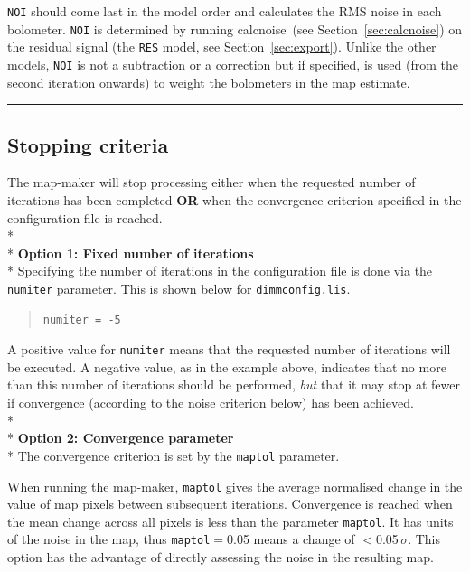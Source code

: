 \documentclass[twoside,11pt]{article}
\newcommand{\htmlref}[2]{#1}
\newenvironment{latexonly}{}{}
\newcommand{\latexhtml}[2]{#1}
\newcommand{\xref}[3]{#1}
\newcommand{\xlabel}[1]{}
\renewcommand{\_}{\texttt{\symbol{95}}}
\newcommand{\task}[1]{\textsf{#1}}
\newcommand{\param}[1]{\texttt{#1}}
\newcommand{\file}[1]{\texttt{#1}}
\newcommand{\model}[1]{\texttt{#1}}
\newcommand{\calcnoise}{\xref{\task{calcnoise}}{sun258}{CALCNOISE}}
\newcommand{\cref}[3]{\latexhtml{#1~\ref{#2}}{\htmlref{#3}{#2}}}
\begin{document}
\begin{latexonly}
\begin{minipage}[t]{0.88\linewidth}\model{NOI} should come last in the model
order and calculates the RMS noise in each bolometer.  \model{NOI} is
determined by running \calcnoise\ (see \cref{Section}{sec:calcnoise}{Checking the
array performance}) on the residual signal (the \model{RES}
model, see \cref{Section}{sec:export}{Exporting individual models}).  Unlike
the other models, \model{NOI} is
not a subtraction or a correction but if specified, is used (from the
second iteration onwards) to weight the bolometers in the map
estimate.\\
\end{minipage}
\hrule
\end{latexonly}

\subsection{\xlabel{convergence}Stopping criteria}
\label{sec:converge}

The map-maker will stop processing either when the requested number of
iterations has been completed \textbf{OR} when the convergence
criterion specified in the configuration file is reached.
\\*\\*
\textbf{Option 1: Fixed number of iterations}\\*
Specifying the number of iterations in the configuration file is done via
the \param{numiter} parameter. This is shown below for \file{dimmconfig.lis}.
\vspace{-0.1cm}
\begin{quote}
\begin{verbatim}
numiter = -5
\end{verbatim}
\end{quote}
\vspace{-0.1cm}
A positive value for \param{numiter} means that the requested number
of iterations will be executed. A negative value, as in the example
above, indicates that no more than this number of iterations should be
performed, \emph{but} that it may stop at fewer if convergence
(according to the noise criterion below) has been achieved.
\\*\\*
\textbf{Option 2: Convergence parameter}\\*
The convergence criterion is set by the \texttt{maptol} parameter.

When running the map-maker, \texttt{maptol} gives the average
normalised change in the value of map pixels
between subsequent iterations. Convergence is reached when the  mean
change across all pixels is less than the parameter \param{maptol}.
It has units of the noise
in the map, thus \texttt{maptol}$=$0.05 means a change of
$<$0.05\,$\sigma$. This option has the advantage of directly assessing
the noise in the resulting map.
\end{document}

